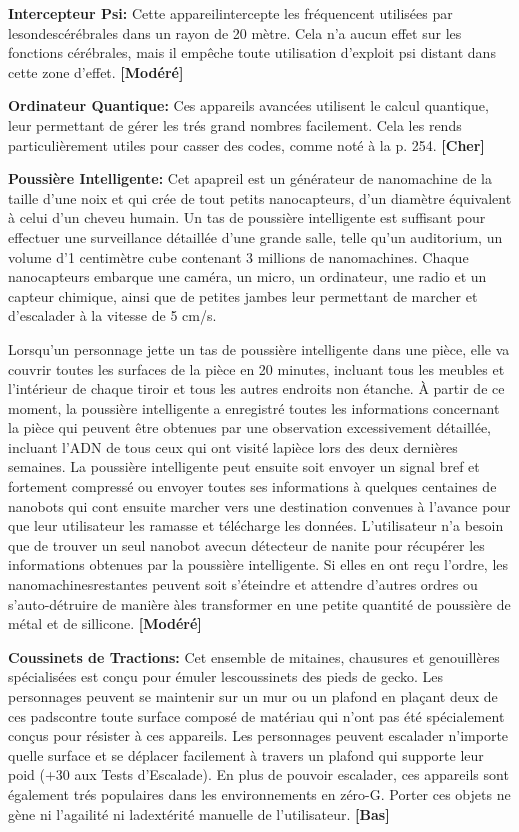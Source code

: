 \textbf{Intercepteur Psi:} Cette appareilintercepte les fréquencent utilisées par lesondescérébrales dans un rayon de 20 mètre. Cela n'a aucun effet sur les fonctions cérébrales, mais il empêche toute utilisation d'exploit psi distant dans cette zone d'effet. \textbf{[Modéré]} 

\textbf{Ordinateur Quantique:} Ces appareils avancées utilisent le calcul quantique, leur permettant de gérer les trés grand nombres facilement.  Cela les rends particulièrement utiles pour casser des codes, comme noté à la p. 254. \textbf{[Cher]} 

\textbf{Poussière Intelligente:} Cet apapreil est un générateur de nanomachine de la taille d'une noix et qui crée de tout petits nanocapteurs, d'un diamètre équivalent à celui d'un cheveu humain. Un tas de poussière intelligente est suffisant pour effectuer une surveillance détaillée d'une grande salle, telle qu'un auditorium, un volume d'1 centimètre cube contenant 3 millions de nanomachines. Chaque nanocapteurs embarque une caméra, un micro, un ordinateur, une radio et un capteur chimique, ainsi que de petites jambes leur permettant de marcher et d'escalader à la vitesse de 5 cm/s. 

Lorsqu'un personnage jette un tas de poussière intelligente dans une pièce, elle va couvrir toutes les surfaces de la pièce en 20 minutes, incluant tous les meubles et l'intérieur de chaque tiroir et tous les autres endroits non étanche. À partir de ce moment, la poussière intelligente a enregistré toutes les informations concernant la pièce qui peuvent être obtenues par une observation excessivement détaillée, incluant l'ADN de tous ceux qui ont visité lapièce lors des deux dernières semaines. La poussière intelligente peut ensuite soit envoyer un signal bref et fortement compressé ou envoyer toutes ses informations à quelques centaines de nanobots qui cont ensuite marcher vers une destination convenues à l'avance pour que leur utilisateur les ramasse et télécharge les données. L'utilisateur n'a besoin que de trouver un seul nanobot avecun détecteur de nanite pour récupérer les informations obtenues par la poussière intelligente. Si elles en ont reçu l'ordre, les nanomachinesrestantes peuvent soit s'éteindre et attendre d'autres ordres ou s'auto-détruire de manière àles transformer en une petite quantité de poussière de métal et de sillicone. \textbf{[Modéré]} 

\textbf{Coussinets de Tractions:} Cet ensemble de mitaines, chausures et genouillères  spécialisées est conçu pour émuler lescoussinets des pieds de gecko. Les personnages peuvent se maintenir sur un mur ou un plafond en plaçant deux de ces padscontre toute surface composé de matériau qui n'ont pas été spécialement conçus pour résister à ces appareils. Les personnages peuvent escalader n'importe quelle surface et se déplacer facilement à travers un plafond qui supporte leur poid (+30 aux Tests d'Escalade). En plus de pouvoir escalader, ces appareils sont également trés populaires dans les environnements en zéro-G. Porter ces objets ne gène ni l'agailité ni ladextérité manuelle de l'utilisateur. \textbf{[Bas]} 

